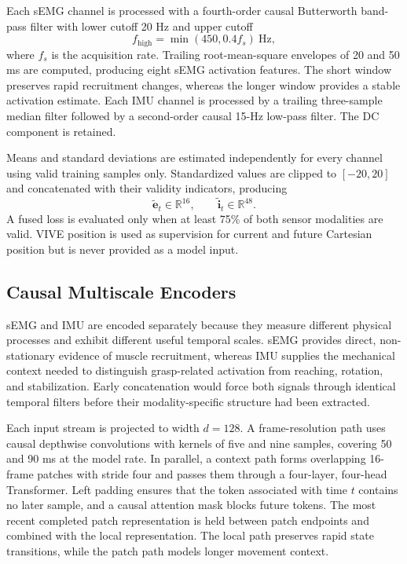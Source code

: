 Each sEMG channel is processed with a fourth-order causal Butterworth band-pass
filter with lower cutoff 20 Hz and upper cutoff
\begin{equation}
    f_{\mathrm{high}}=\min(450,0.4f_s)\ \mathrm{Hz},
\end{equation}
where $f_s$ is the acquisition rate. Trailing root-mean-square envelopes of
20 and 50 ms are computed, producing eight sEMG activation features. The short
window preserves rapid recruitment changes, whereas the longer window provides
a stable activation estimate. Each IMU channel is processed by a trailing
three-sample median filter followed by a second-order causal 15-Hz low-pass
filter. The DC component is retained.

Means and standard deviations are estimated independently for every channel
using valid training samples only. Standardized values are clipped to
$[-20,20]$ and concatenated with their validity indicators, producing
\begin{equation}
    \tilde{\mathbf e}_t\in\mathbb{R}^{16},\qquad
    \tilde{\mathbf i}_t\in\mathbb{R}^{48}.
\end{equation}
A fused loss is evaluated only when at least 75\% of both sensor modalities are
valid. VIVE position is used as supervision for current and future Cartesian
position but is never provided as a model input.

\subsection{Causal Multiscale Encoders}
\label{subsec:encoders}

sEMG and IMU are encoded separately because they measure different physical
processes and exhibit different useful temporal scales. sEMG provides direct,
non-stationary evidence of muscle recruitment, whereas IMU supplies the
mechanical context needed to distinguish grasp-related activation from
reaching, rotation, and stabilization. Early concatenation would force both
signals through identical temporal filters before their modality-specific
structure had been extracted.

Each input stream is projected to width $d=128$. A frame-resolution path uses
causal depthwise convolutions with kernels of five and nine samples, covering
50 and 90 ms at the model rate. In parallel, a context path forms overlapping
16-frame patches with stride four and passes them through a four-layer,
four-head Transformer. Left padding ensures that the token associated with
time $t$ contains no later sample, and a causal attention mask blocks future
tokens. The most recent completed patch representation is held between patch
endpoints and combined with the local representation. The local path preserves
rapid state transitions, while the patch path models longer movement context.

